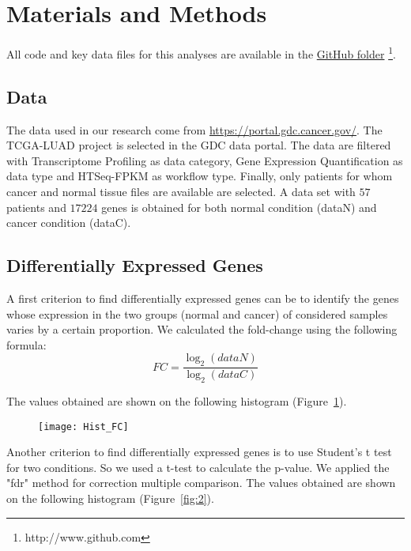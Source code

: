 \documentclass[
10pt, %
a4paper, %
oneside, %
headinclude,footinclude, %
BCOR5mm, %
]{scrartcl}
\begin{document}
\section{Materials and Methods}

All code and key data files for this analyses are available in the \href{http://www.github.com}{GitHub folder} \footnote{http://www.github.com}.


\subsection{Data}
The data used in our research come from \url{https://portal.gdc.cancer.gov/}. The TCGA-LUAD project is selected in the GDC data portal. The data are filtered with Transcriptome Profiling as data category, Gene Expression Quantification as data type and HTSeq-FPKM as workflow type. Finally, only patients for whom cancer and normal tissue files are available are selected. A data set with $57$ patients and $17224$ genes is obtained for both normal condition (dataN) and cancer condition (dataC).


\subsection{Differentially Expressed Genes}
A first criterion to find differentially expressed genes can be to identify the genes whose expression in the two groups (normal and cancer) of considered samples varies by a certain proportion. We calculated the fold-change using the following formula:
$$
FC = \frac{\log_2{(dataN)}}{\log_2{(dataC)}}
$$

The values obtained are shown on the following histogram (Figure~\ref{fig:1}).

\begin{figure}[!h]
\centering 
\texttt{[image: Hist\_FC]} 
\caption[Histogram of FC]{} %
\label{fig:1} 
\end{figure}
Another criterion to find differentially expressed genes is to use Student’s t test for two conditions.
So we used a t-test to calculate the p-value.
We applied the "fdr" method for correction multiple comparison. 
The values obtained are shown on the following histogram (Figure~\ref{fig:2}).
\end{document}
